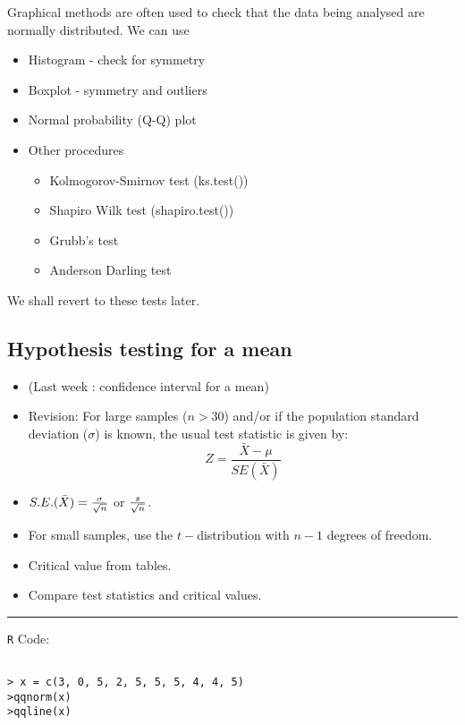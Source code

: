Graphical methods are often used to check that the data being
analysed are normally distributed. We can use
\begin{itemize}
\item Histogram - check for symmetry \item Boxplot - symmetry and
outliers \item Normal probability (Q-Q) plot

\item Other procedures
\begin{itemize}
\item Kolmogorov-Smirnov test (ks.test())\item Shapiro Wilk test (shapiro.test()) \item
Grubb's test \item Anderson Darling test
\end{itemize}
\end{itemize}
We shall revert to these tests later.
%


\subsection{Hypothesis testing for a mean}

\begin{itemize}
\item (Last week : confidence interval for a mean) \item Revision:
For large samples ($n > 30$) and/or if the population standard
deviation ($\sigma$) is known, the usual test statistic is given
by: \[Z =\frac{\bar{X} - \mu}{SE(\bar{X})}\]

\item $S.E.(\bar{X}) = { \sigma \over \sqrt{n}} $ or ${s \over \sqrt{n}}$. \item For small samples, use the $t-$distribution
with $n-1$ degrees of freedom.
\item
Critical value from tables.
\item Compare test statistics and critical values.
\end{itemize}


%



\rule{12.1cm}{0.25mm}
\texttt{R} Code:
\begin{verbatim}

> x = c(3, 0, 5, 2, 5, 5, 5, 4, 4, 5)
>qqnorm(x)
>qqline(x)

\end{verbatim}

%



